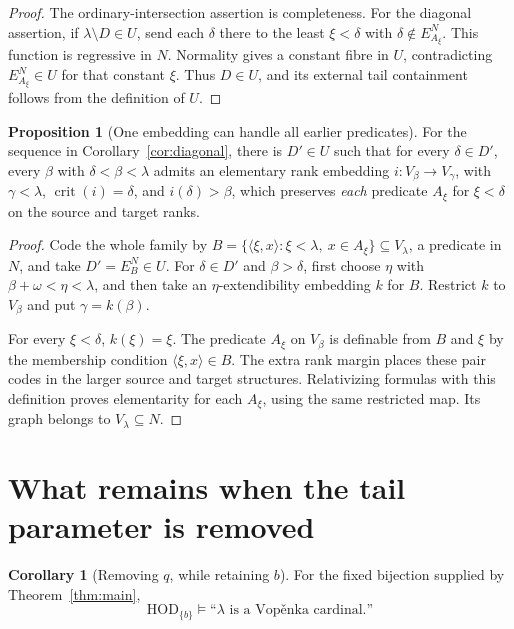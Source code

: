 \documentclass[11pt,letterpaper]{article}
\theoremstyle{definition}
\newtheorem{proposition}[definition]{Proposition}
\newtheorem{corollary}[definition]{Corollary}
\numberwithin{equation}{section}
\newcommand{\HOD}{\mathrm{HOD}}
\newcommand{\crit}{\operatorname{crit}}
\newcommand{\Vop}{Vop\v{e}nka}
\newcommand{\pair}[2]{\langle #1,#2\rangle}
\begin{document}
\begin{proof}
The ordinary-intersection assertion is completeness. For the diagonal assertion, if $\lambda\setminus D\in U$, send each $\delta$ there to the least $\xi<\delta$ with $\delta\notin E_{A_\xi}^N$. This function is regressive in $N$. Normality gives a constant fibre in $U$, contradicting $E_{A_\xi}^N\in U$ for that constant $\xi$. Thus $D\in U$, and its external tail containment follows from the definition of $U$.
\end{proof}

\begin{proposition}[One embedding can handle all earlier predicates]\label{prop:simultaneous}
For the sequence in Corollary~\ref{cor:diagonal}, there is $D'\in U$ such that for every $\delta\in D'$, every $\beta$ with $\delta<\beta<\lambda$ admits an elementary rank embedding $i:V_\beta\to V_\gamma$, with $\gamma<\lambda$, $\crit(i)=\delta$, and $i(\delta)>\beta$, which preserves \emph{each} predicate $A_\xi$ for $\xi<\delta$ on the source and target ranks.
\end{proposition}

\begin{proof}
Code the whole family by
$B=\{\pair\xi x:\xi<\lambda,\ x\in A_\xi\}\subseteq V_\lambda$, a predicate in $N$, and take $D'=E_B^N\in U$. For $\delta\in D'$ and $\beta>\delta$, first choose $\eta$ with $\beta+\omega<\eta<\lambda$, and then take an $\eta$-extendibility embedding $k$ for $B$. Restrict $k$ to $V_\beta$ and put $\gamma=k(\beta)$.

For every $\xi<\delta$, $k(\xi)=\xi$. The predicate $A_\xi$ on $V_\beta$ is definable from $B$ and $\xi$ by the membership condition $\pair\xi x\in B$. The extra rank margin places these pair codes in the larger source and target structures. Relativizing formulas with this definition proves elementarity for each $A_\xi$, using the same restricted map. Its graph belongs to $V_\lambda\subseteq N$.
\end{proof}

\section{What remains when the tail parameter is removed}\label{sec:remove}

\begin{corollary}[Removing $q$, while retaining $b$]\label{cor:HODb}
For the fixed bijection supplied by Theorem~\ref{thm:main},
\[
 \HOD_{\{b\}}\models\text{``$\lambda$ is a \Vop\ cardinal.''}
\]
\end{corollary}
\end{document}
